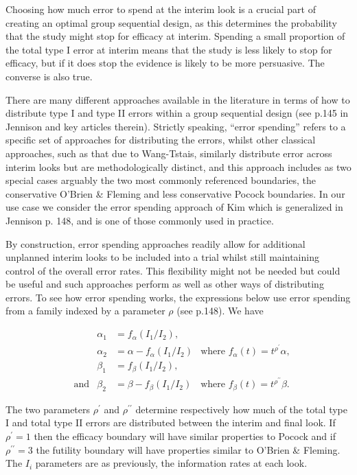 \documentclass{article}
\begin{document}
Choosing how much error to spend at the interim look is a crucial part of creating an optimal group sequential design, as this determines the probability that the study might stop for efficacy at interim. Spending a small proportion of the total type I error at interim means that the study is less likely to stop for efficacy, but if it does stop the evidence is likely to be more persuasive. The converse is also true.  

There are many different approaches available in the literature in terms of how to distribute type I and type II errors within a group sequential design (see p.145 in Jennison\citep{Jennison:2000aa} and key articles therein\citep{Lan1983, Kim1987a,Hwang1990, DeMets:1994aa}).  Strictly speaking, ``error spending'' refers to a specific set of approaches for distributing the errors, whilst other classical approaches, such as that due to Wang-Tstais\citep{Wang1987}, similarly distribute error across interim looks but are methodologically distinct, and this approach includes as two special cases arguably the two most commonly referenced boundaries, the conservative O'Brien \& Fleming and less conservative Pocock boundaries. In our use case we consider the error spending approach of Kim\citep{Kim1987a} which is generalized in Jennison\citep{Jennison:2000aa} p. 148, and is one of those commonly used in practice. 

By construction, error spending approaches readily allow for additional unplanned interim looks to be included into a trial whilst still maintaining control of the overall error rates. This flexibility might not be needed but could be useful and such approaches perform as well as other ways of distributing errors. To see how error spending works, the expressions below use error spending from a family indexed by a parameter $\rho$ (see \citep{Jennison:2000aa} p.148). We have  
\begin{fleqn}
\begin{align}
&&\alpha_1&=f_\alpha(I_ {1}/I_{2}),&\label{spend1}\\
&&\alpha_2&=\alpha - f_\alpha(I_ {1}/I_{2})&\text{where }f_\alpha(t)=t^{\rho^\prime} \alpha,\label{spend2}\\
&&\beta_1&=f_\beta(I_ {1}/I_{2}),&\label{spend3}\\
&\text{and}&\beta_2&=\beta - f_\beta(I_ {1}/I_{2})&\text{where }f_\beta(t)=t^{\rho^{\prime\prime}}\beta.\label{spend4}
\end{align}
\end{fleqn}   
The two parameters $\rho^\prime$ and $\rho^{\prime\prime}$ determine respectively how much of the total type I and total type II errors are distributed between the interim and final look. If $\rho^\prime=1$ then the efficacy boundary will have similar properties to Pocock and if  $\rho^{\prime\prime}=3$ the futility boundary will have properties similar to O'Brien \& Fleming. The $I_i$ parameters are as previously, the information rates at each look.  
\end{document}
